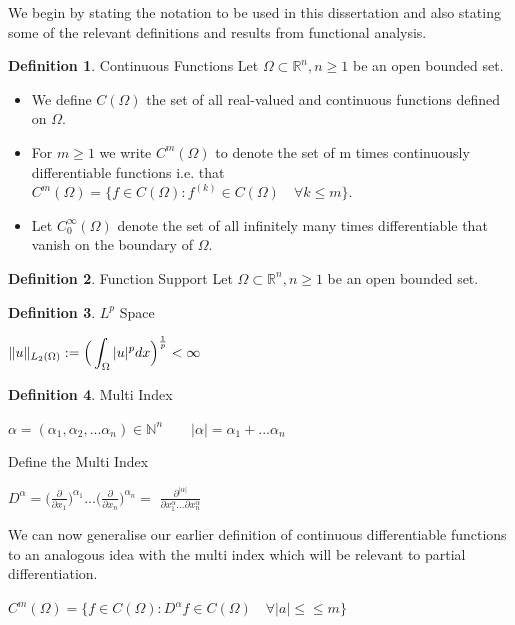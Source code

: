 \documentclass{uonmathreport}
\theoremstyle{definition}
\newtheorem{definition}{Definition}[section]
\theoremstyle{problem}
\theoremstyle{theorem}
\begin{document}
We begin by stating the notation to be used in this dissertation and also stating some of the relevant definitions and results from functional analysis.

\theoremstyle{definition}
\begin{definition}{Continuous Functions}
Let $\Omega \subset \mathbb{R}^n, n \geq 1$ be an open bounded set. 
\begin{itemize}
\item We define $C(\Omega)$  the set of all real-valued and continuous functions defined on $\Omega$.
\item For $m \geq1$ we write $C^m(\Omega)$ to denote the set of m times continuously differentiable functions  i.e. that $C^m(\Omega) = \{f \in C(\Omega) : f^{(k)} \in C(\Omega)\quad \forall k \leq m\} $.
\item Let $C^{\infty}_0(\Omega) $ denote the set of all infinitely many times differentiable that vanish on the boundary of $\Omega$.
\end{itemize}
\end{definition}


\theoremstyle{definition}
\begin{definition}{Function Support}
Let $\Omega \subset \mathbb{R}^n, n \geq 1$ be an open bounded set. 

\end{definition}

\theoremstyle{definition}
\begin{definition}{$L^p$ Space}

$\|u\|_{L_2(\Omega)} := \mathlarger{\Big(\int_\Omega  { |u|^p } dx\Big)}^{\frac{1}{p}} < \infty$

\end{definition}


\theoremstyle{definition}
\begin{definition}{Multi Index}

$\alpha = (\alpha_1, \alpha_2, ... \alpha_n) \in \mathbb{N}^n \quad \quad   |\alpha| = \alpha_1 + ... \alpha_n$

Define the Multi Index 

$D^{\alpha} = \Big(\frac{\partial}{\partial x_1}\Big)^{\alpha_1}...\Big(\frac{\partial}{\partial x_n}\Big)^{\alpha_n} = $
$\frac{\partial^{|\alpha|}}{\partial x^{\alpha}_1 ... \partial x^{\alpha}_n}$

We can now generalise our earlier definition of continuous differentiable functions to an analogous idea with the multi index which will be relevant to partial differentiation.

$C^m(\Omega) = \{f \in C(\Omega) : D^\alpha f \in C(\Omega)\quad \forall |a| \leq\leq m\} $

\end{definition}
\end{document}
